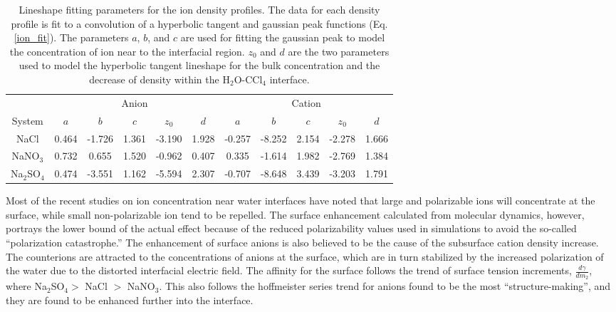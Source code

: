 \begin{table}[htdp]
	\begin{center}
	\begin{tabular}{c|c|c|c|c|c|c|c|c|c|c|}
		\cline{2-11}
		\multicolumn{1}{c|}{} & \multicolumn{5}{c}{Anion} & \multicolumn{5}{|c|}{Cation} \\ 
		\cline{1-11}
		\multicolumn{1}{|c|}{System} & $a$ & $b$ & $c$ & $z_0$ & $d$ & $a$ & $b$ & $c$ & $z_0$ & $d$ \\ \hline
		\multicolumn{1}{|c|}{NaCl} & 0.464 & -1.726 & 1.361 & -3.190 & 1.928 & -0.257 & -8.252 & 2.154 & -2.278 & 1.666 \\ \hline
		\multicolumn{1}{|c|}{NaNO$_3$} & 0.732 & 0.655 & 1.520 & -0.962 & 0.407 & 0.335 & -1.614 & 1.982 & -2.769 & 1.384 \\ \hline
		\multicolumn{1}{|c|}{Na$_2$SO$_4$} & 0.474 & -3.551 & 1.162 & -5.594 & 2.307 & -0.707 & -8.648 & 3.439 & -3.203 & 1.791 \\ \hline
	\end{tabular}
	\end{center}
	\caption{Lineshape fitting parameters for the ion density profiles. The data for each density profile is fit to a convolution of a hyperbolic tangent and gaussian peak functions (Eq. \ref{ion_fit}). The parameters $a$, $b$, and $c$ are used for fitting the gaussian peak to model the concentration of ion near to the interfacial region. $z_0$ and $d$ are the two parameters used to model the hyperbolic tangent lineshape for the bulk concentration and the decrease of density within the H$_2$O-CCl$_4$ interface.}
	\label{ion_params}
\end{table}

Most of the recent studies on ion concentration near water interfaces have noted that large and polarizable ions will concentrate at the surface,\cite{Petersen2005b,Pegram2006,Sloutskin2007,Eggimann2008} while small non-polarizable ion tend to be repelled. The surface enhancement calculated from molecular dynamics, however, portrays the lower bound of the actual effect because of the reduced polarizability values used in simulations to avoid the so-called ``polarization catastrophe.'' The enhancement of surface anions is also believed to be the cause of the subsurface cation density increase. The counterions are attracted to the concentrations of anions at the surface, which are in turn stabilized by the increased polarization of the water due to the distorted interfacial electric field. The affinity for the surface follows the trend of surface tension increments, $\frac{d\gamma}{dm_2}$, where Na$_2$SO$_4 >$ NaCl $>$ NaNO$_3$.\cite{Pegram2006} This also follows the hoffmeister series trend for anions found to be the most ``structure-making'', and they are found to be enhanced further into the interface.
